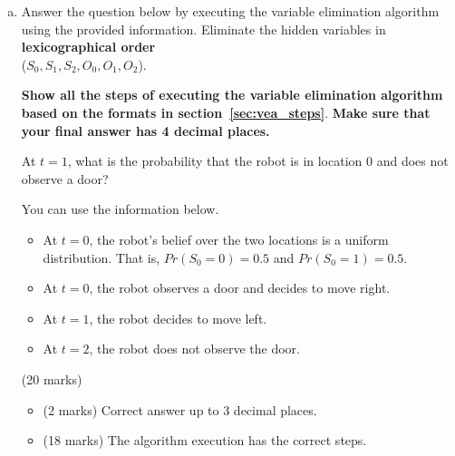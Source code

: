 \documentclass[12pt]{article}
\begin{document}
\begin{enumerate}[(a)]
\begin{problem}
\end{problem}

\begin{markscheme}
(2 marks) Correct answer up to 3 decimal places. All or nothing.

\end{markscheme}


\item
\label{q1_general}
Answer the question below by executing the variable elimination algorithm using the provided information. 
Eliminate the hidden variables in {\bf lexicographical order} \\
($S_0, S_1, S_2, O_0, O_1, O_2$). 

{\bf Show all the steps of executing the variable elimination algorithm based on the formats in section~\ref{sec:vea_steps}}. {\bf Make sure that your final answer has 4 decimal places.}

\begin{problem}
At $t=1$, what is the probability that the robot is in location $0$ and does not observe a door? 

You can use the information below.
\begin{itemize}
    \item At $t=0$, the robot's belief over the two locations is a uniform distribution.  That is, $Pr(S_0 = 0) = 0.5$ and $Pr(S_0 = 1) = 0.5$.
    \item At $t=0$, the robot observes a door and decides to move right.
    \item At $t=1$, the robot decides to move left.
    \item At $t=2$, the robot does not observe the door.
\end{itemize}
\end{problem}


\begin{markscheme}
(20 marks)

\begin{itemize} 
\item
(2 marks) Correct answer up to 3 decimal places.
\item 
(18 marks) The algorithm execution has the correct steps.
\end{itemize}

\end{markscheme}



\end{enumerate}
\end{document}
